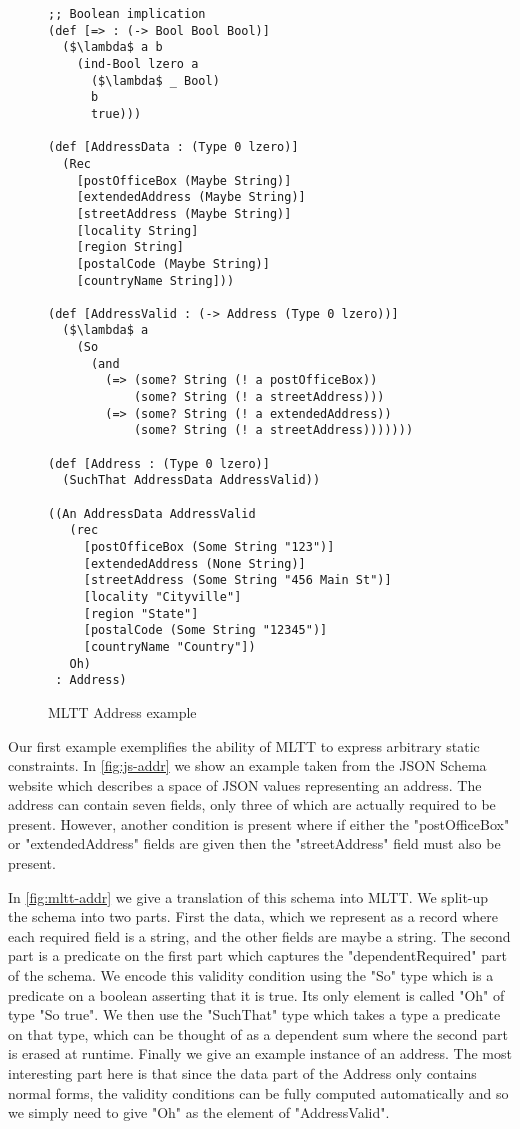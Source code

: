 \documentclass{article}
\begin{document}
\begin{figure}[!h]
  {\scriptsize
  \begin{lstlisting}
;; Boolean implication
(def [=> : (-> Bool Bool Bool)]
  ($\lambda$ a b
    (ind-Bool lzero a
      ($\lambda$ _ Bool)
      b
      true)))

(def [AddressData : (Type 0 lzero)]
  (Rec
    [postOfficeBox (Maybe String)]
    [extendedAddress (Maybe String)]
    [streetAddress (Maybe String)]
    [locality String]
    [region String]
    [postalCode (Maybe String)]
    [countryName String]))

(def [AddressValid : (-> Address (Type 0 lzero))]
  ($\lambda$ a
    (So
      (and
        (=> (some? String (! a postOfficeBox))
            (some? String (! a streetAddress)))
        (=> (some? String (! a extendedAddress))
            (some? String (! a streetAddress)))))))

(def [Address : (Type 0 lzero)]
  (SuchThat AddressData AddressValid))

((An AddressData AddressValid
   (rec
     [postOfficeBox (Some String "123")]
     [extendedAddress (None String)]
     [streetAddress (Some String "456 Main St")]
     [locality "Cityville"]
     [region "State"]
     [postalCode (Some String "12345")]
     [countryName "Country"])
   Oh)
 : Address)
  \end{lstlisting}
  }
  \caption{MLTT Address example}
  \label{fig:mltt-addr}
\end{figure}

Our first example exemplifies the ability of MLTT to express arbitrary static constraints.
In \autoref{fig:js-addr} we show an example taken from the JSON Schema website  which describes a space of JSON values representing an address.
The address can contain seven fields, only three of which are actually required to be present.
However, another condition is present where if either the "postOfficeBox" or "extendedAddress" fields are given then the "streetAddress" field must also be present.

In \autoref{fig:mltt-addr} we give a translation of this schema into MLTT.
We split-up the schema into two parts.
First the data, which we represent as a record where each required field is a string, and the other fields are maybe a string.
The second part is a predicate on the first part which captures the "dependentRequired" part of the schema.
We encode this validity condition using the "So" type which is a predicate on a boolean asserting that it is true.
Its only element is called "Oh" of type "So true".
We then use the "SuchThat" type which takes a type a predicate on that type, which can be thought of as a dependent sum where the second part is erased at runtime.
Finally we give an example instance of an address.
The most interesting part here is that since the data part of the Address only contains normal forms, the validity conditions can be fully computed automatically and so we simply need to give "Oh" as the element of "AddressValid".
\end{document}
